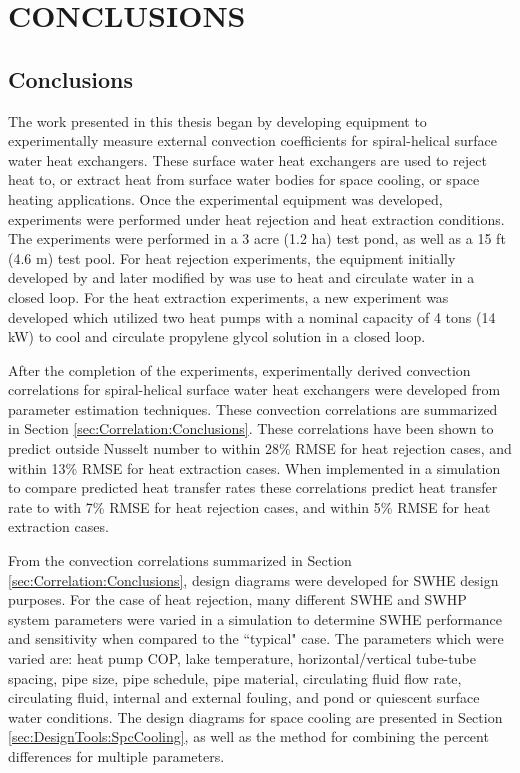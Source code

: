 
\chapter{CONCLUSIONS}
\label{ch:Conclusion}

\section{Conclusions}
The work presented in this thesis began by developing equipment to experimentally measure external convection coefficients for spiral-helical surface water heat exchangers. These surface water heat exchangers are used to reject heat to, or extract heat from surface water bodies for space cooling, or space heating applications. Once the experimental equipment was developed, experiments were performed under heat rejection and heat extraction conditions. The experiments were performed in a 3 acre (1.2 ha) test pond, as well as a 15 ft (4.6 m) test pool. For heat rejection experiments, the equipment initially developed by \cite{Austin1998} and later modified by \cite{Hansen2011} was use to heat and circulate water in a closed loop. For the heat extraction experiments, a new experiment was developed which utilized two heat pumps with a nominal capacity of 4 tons (14 kW) to cool and circulate propylene glycol solution in a closed loop.

After the completion of the experiments, experimentally derived convection correlations for spiral-helical surface water heat exchangers were developed from parameter estimation techniques. These convection correlations are summarized in Section \ref{sec:Correlation:Conclusions}. These correlations have been shown to predict outside Nusselt number to within 28\% RMSE for heat rejection cases, and within 13\% RMSE for heat extraction cases. When implemented in a simulation to compare predicted heat transfer rates these correlations predict heat transfer rate to with 7\% RMSE for heat rejection cases, and within 5\% RMSE for heat extraction cases. 

From the convection correlations summarized in Section \ref{sec:Correlation:Conclusions}, design diagrams were developed for SWHE design purposes. For the case of heat rejection, many different SWHE and SWHP system parameters were varied in a simulation to determine SWHE performance and sensitivity when compared to the ``typical" case. The parameters which were varied are: heat pump COP, lake temperature, horizontal/vertical tube-tube spacing, pipe size, pipe schedule, pipe material, circulating fluid flow rate, circulating fluid, internal and external fouling, and pond or quiescent surface water conditions. The design diagrams for space cooling are presented in Section \ref{sec:DesignTools:SpcCooling}, as well as the method for combining the percent differences for multiple parameters.

